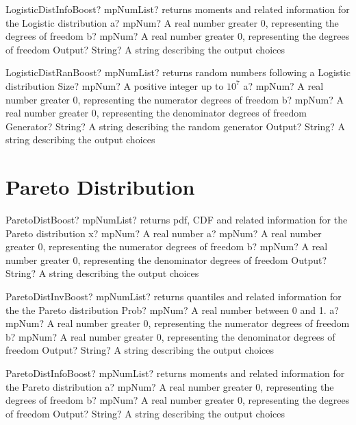 \documentclass[12pt,a4paper,openany]{book}
\begin{document}
\begin{mpFunctionsExtract}
\mpFunctionThree
{LogisticDistInfoBoost? mpNumList? returns moments and related information for the Logistic distribution}
{a? mpNum? A real number greater 0, representing the degrees of freedom}
{b? mpNum? A real number greater 0, representing the degrees of freedom}
{Output? String? A string describing the output choices}
\end{mpFunctionsExtract}

\begin{mpFunctionsExtract}
\mpFunctionFive
{LogisticDistRanBoost? mpNumList? returns random numbers following a Logistic distribution}
{Size? mpNum? A positive integer up to $10^7$}
{a? mpNum? A real number greater 0, representing the numerator  degrees of freedom}
{b? mpNum? A real number greater 0, representing the denominator degrees of freedom}
{Generator? String? A string describing the random generator}
{Output? String? A string describing the output choices}
\end{mpFunctionsExtract}

\section{Pareto Distribution}

\begin{mpFunctionsExtract}
\mpFunctionFour
{ParetoDistBoost? mpNumList? returns pdf, CDF and related information for the Pareto distribution}
{x? mpNum? A real number}
{a? mpNum? A real number greater 0, representing the numerator  degrees of freedom}
{b? mpNum? A real number greater 0, representing the denominator degrees of freedom}
{Output? String? A string describing the output choices}
\end{mpFunctionsExtract}

\begin{mpFunctionsExtract}
\mpFunctionFour
{ParetoDistInvBoost? mpNumList? returns quantiles and related information for the the Pareto distribution}
{Prob? mpNum? A real number between 0 and 1.}
{a? mpNum? A real number greater 0, representing the numerator  degrees of freedom}
{b? mpNum? A real number greater 0, representing the denominator degrees of freedom}
{Output? String? A string describing the output choices}
\end{mpFunctionsExtract}

\begin{mpFunctionsExtract}
\mpFunctionThree
{ParetoDistInfoBoost? mpNumList? returns moments and related information for the Pareto distribution}
{a? mpNum? A real number greater 0, representing the degrees of freedom}
{b? mpNum? A real number greater 0, representing the degrees of freedom}
{Output? String? A string describing the output choices}
\end{mpFunctionsExtract}
\end{document}
